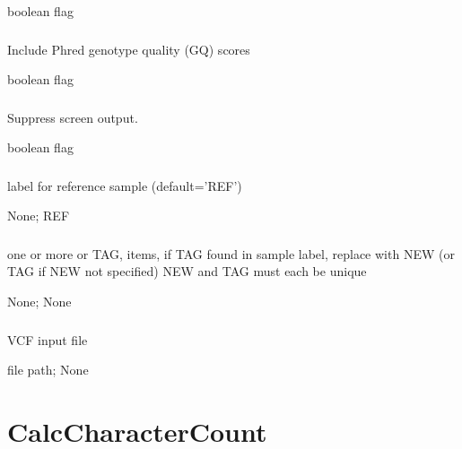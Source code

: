 \documentclass[letterpaper,11pt,english]{sphinxmanual}
\begin{document}
 boolean flag


\subsubsection{}
\label{\detokenize{prog_desc:qual}}
 Include Phred genotype quality (GQ) scores

 boolean flag


\subsubsection{}
\label{\detokenize{prog_desc:id41}}
 Suppress screen output.

 boolean flag


\subsubsection{}
\label{\detokenize{prog_desc:id42}}
 label for reference sample (default=’REF’)

 None;  REF


\subsubsection{}
\label{\detokenize{prog_desc:id43}}
 one or more  or TAG, items, if TAG found in sample label, replace with NEW (or TAG if NEW not specified) NEW and TAG must each be unique

 None;  None


\subsubsection{}
\label{\detokenize{prog_desc:vcf}}
 VCF input file

 file path;  None


\section{CalcCharacterCount}
\label{\detokenize{prog_desc:calccharactercount}}
\end{document}
